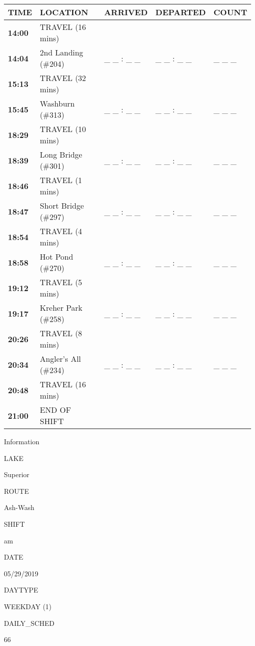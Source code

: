 \documentclass[]{article}
\begin{document}
\begin{tabular}{>{\bfseries}lllll}
\toprule
\textbf{TIME} & \textbf{LOCATION} & \textbf{ARRIVED} & \textbf{DEPARTED} & \textbf{COUNT}\\
\midrule
14:00 & TRAVEL (16 mins) &  &  & \\
14:04 & 2nd Landing (\#204) & \_ \_ : \_ \_ & \_ \_ : \_ \_ & \_ \_ \_\\
15:13 & TRAVEL (32 mins) &  &  & \\
15:45 & Washburn (\#313) & \_ \_ : \_ \_ & \_ \_ : \_ \_ & \_ \_ \_\\
18:29 & TRAVEL (10 mins) &  &  & \\
18:39 & Long Bridge (\#301) & \_ \_ : \_ \_ & \_ \_ : \_ \_ & \_ \_ \_\\
18:46 & TRAVEL (1 mins) &  &  & \\
18:47 & Short Bridge (\#297) & \_ \_ : \_ \_ & \_ \_ : \_ \_ & \_ \_ \_\\
18:54 & TRAVEL (4 mins) &  &  & \\
18:58 & Hot Pond (\#270) & \_ \_ : \_ \_ & \_ \_ : \_ \_ & \_ \_ \_\\
19:12 & TRAVEL (5 mins) &  &  & \\
19:17 & Kreher Park (\#258) & \_ \_ : \_ \_ & \_ \_ : \_ \_ & \_ \_ \_\\
20:26 & TRAVEL (8 mins) &  &  & \\
20:34 & Angler's All (\#234) & \_ \_ : \_ \_ & \_ \_ : \_ \_ & \_ \_ \_\\
20:48 & TRAVEL (16 mins) &  &  & \\
21:00 & END OF SHIFT &  &  & \\
\bottomrule
\end{tabular}\newpage

Information

LAKE

Superior

ROUTE

Ash-Wash

SHIFT

am

DATE

05/29/2019

DAYTYPE

WEEKDAY (1)

DAILY\_SCHED

66

\vspace{24pt}
\end{document}
